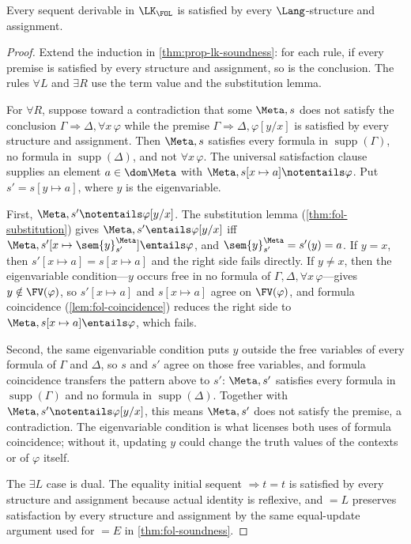 \begin{theorem}
\label{thm:fol-lk-soundness}
Every sequent derivable in \(\LK_{\FOL}\) is satisfied by every
\(\Lang\)-structure and assignment.
\end{theorem}
\begin{proof}
Extend the induction in \cref{thm:prop-lk-soundness}: for each rule,
if every premise is satisfied by every structure and assignment, so is the
conclusion.  The rules \(\forall L\) and \(\exists R\) use the term value
and the substitution lemma.

For \(\forall R\), suppose toward a contradiction that some \(\Meta,s\)
does not satisfy the conclusion
\(\Gamma\Rightarrow\Delta,\forall x\,\varphi\) while the premise
\(\Gamma\Rightarrow\Delta,\varphi[y/x]\) is satisfied by every structure
and assignment.  Then \(\Meta,s\) satisfies every formula in
\(\operatorname{supp}(\Gamma)\), no formula in
\(\operatorname{supp}(\Delta)\), and not \(\forall x\,\varphi\).  The
universal satisfaction clause supplies an element \(a\in\dom\Meta\)
with \(\Meta,s[x\mapsto a]\notentails\varphi\).  Put
\(s'=s[y\mapsto a]\), where \(y\) is the eigenvariable.

First, \(\Meta,s'\notentails\varphi[y/x]\).  The substitution lemma
(\cref{thm:fol-substitution}) gives
\(\Meta,s'\entails\varphi[y/x]\) iff
\(\Meta,s'[x\mapsto\sem{y}^{\Meta}_{s'}]\entails\varphi\), and
\(\sem{y}^{\Meta}_{s'}=s'(y)=a\).  If \(y=x\), then
\(s'[x\mapsto a]=s[x\mapsto a]\) and the right side fails directly.  If
\(y\ne x\), then the eigenvariable condition---\(y\) occurs free in no
formula of \(\Gamma,\Delta,\forall x\,\varphi\)---gives
\(y\notin\FV(\varphi)\), so \(s'[x\mapsto a]\) and
\(s[x\mapsto a]\) agree on \(\FV(\varphi)\), and formula coincidence
(\cref{lem:fol-coincidence}) reduces the right side to
\(\Meta,s[x\mapsto a]\entails\varphi\), which fails.

Second, the same eigenvariable condition puts \(y\) outside the free
variables of every formula of \(\Gamma\) and \(\Delta\), so \(s\) and
\(s'\) agree on those free variables, and formula coincidence transfers
the pattern above to \(s'\): \(\Meta,s'\) satisfies every formula in
\(\operatorname{supp}(\Gamma)\) and no formula in
\(\operatorname{supp}(\Delta)\).  Together with
\(\Meta,s'\notentails\varphi[y/x]\), this means \(\Meta,s'\) does not
satisfy the premise, a contradiction.  The eigenvariable condition is what
licenses both uses of formula coincidence; without it, updating \(y\)
could change the truth values of the contexts or of \(\varphi\) itself.

The \(\exists L\) case is dual.  The equality initial sequent
\(\Rightarrow t=t\) is satisfied by every structure and assignment
because actual identity is reflexive, and \(=L\) preserves satisfaction by
every structure and assignment by the same equal-update argument used for
\(=E\) in \cref{thm:fol-soundness}.
\end{proof}

